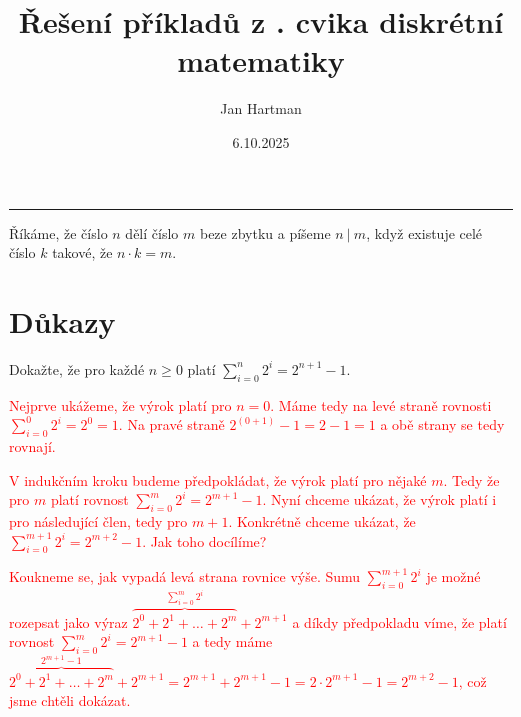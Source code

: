 \documentclass[10pt]{article}
\title{Řešení příkladů z \tutnum. cvika diskrétní matematiky}
\author{Jan Hartman}
\date{6.10.2025}
\newcommand{\titlerule}{%
    \vspace{5pt}
\noindent %
    \makebox[\textwidth]{\large \thetitle \hfill \thedate}
    \rule{\textwidth}{0.4pt}%
}
\begin{document}
\titlerule

\begin{defn}
    Říkáme, že číslo $n$ dělí číslo $m$ beze zbytku a píšeme $n \ | \ m$, když existuje celé číslo $k$ takové, že $n \cdot k = m$.
\end{defn}

\section{Důkazy}

\begin{problem}
Dokažte, že pro každé $n \geq 0$ platí $\sum_{i=0}^{n}2^i = 2^{n+1} - 1$.

\vspace{5pt}
\noindent
\textcolor{red}{Nejprve ukážeme, že výrok platí pro $n=0$. Máme tedy na levé straně rovnosti $\sum_{i=0}^{0}2^i=2^0=1$. Na pravé straně $2^{(0+1)}-1=2-1=1$ a obě strany se tedy rovnají.}

\vspace{5pt}
\noindent
\textcolor{red}{V indukčním kroku budeme předpokládat, že výrok platí pro nějaké $m$. Tedy že pro $m$ platí rovnost $\sum_{i=0}^{m}2^i = 2^{m+1} - 1$. Nyní chceme ukázat, že výrok platí i pro následující člen, tedy pro $m+1$. Konkrétně chceme ukázat, že $\sum_{i=0}^{m+1}2^i = 2^{m+2} - 1$. Jak toho docílíme?}

\vspace{5pt}
\noindent
\textcolor{red}{Koukneme se, jak vypadá levá strana rovnice výše. Sumu $\sum_{i=0}^{m+1}2^i$ je možné rozepsat jako výraz $\overbrace{2^0 + 2^1 + \ldots + 2^m}^{\sum_{i=0}^{m}2^i} + 2^{m+1}$ a díkdy předpokladu víme, že platí rovnost $\sum_{i=0}^{m}2^i = 2^{m+1} - 1$ a tedy máme $\overbrace{2^0 + 2^1 + \ldots + 2^m}^{2^{m+1}-1} + 2^{m+1} = 2^{m+1} + 2^{m+1} - 1 = 2 \cdot 2^{m+1} - 1 = 2^{m+2} -1$, což jsme chtěli dokázat.}
\end{problem}
\end{document}
